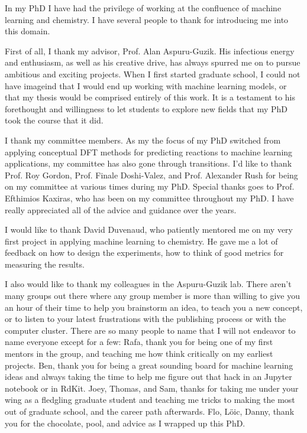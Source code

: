In my PhD I have had the privilege of working at the confluence of machine learning and chemistry. I have several people to thank for introducing me into this domain.

First of all, I thank my advisor, Prof. Alan Aspuru-Guzik. His infectious energy and enthusiasm, as well as his creative drive, has always spurred me on to pursue ambitious and exciting projects. When I first started graduate school, I could not have imageind that I would end up working with machine learning models, or that my thesis would be comprised entirely of this work. It is a testament to his forethought and willingness to let students to explore new fields that my PhD took the course that it did. 

I thank my committee members. As my the focus of my PhD switched from applying conceptual DFT methods for predicting reactions to machine learning applications, my committee has also gone through transitions. I'd like to thank Prof. Roy Gordon, Prof. Finale Doshi-Valez, and Prof. Alexander Rush for being on my committee at various times during my PhD. Special thanks goes to Prof. Efthimios Kaxiras, who has been on my committee throughout my PhD. I have really appreciated all of the advice and guidance over the years.

I would like to thank David Duvenaud, who patiently mentored me on my very first project in applying machine learning to chemistry. He gave me a lot of feedback on how to design the experiments, how to think of good metrics for measuring the results. 

I also would like to thank my colleagues in the Aspuru-Guzik lab.  There aren't many groups out there where any group member is more than willing to give you an hour of their time to help you brainstorm an idea, to teach you a new concept, or to listen to your latest frustrations with the publishing process or with the computer cluster. There are so many people to name that I will not endeavor to name everyone except for a few: Rafa, thank you for being one of my first mentors in the group, and teaching me how think critically on my earliest projects. Ben, thank you for being a great sounding board for machine learning ideas and always taking the time to help me figure out that hack in an Jupyter notebook or in RdKit. Joey, Thomas, and Sam, thanks for taking me under your wing as a fledgling graduate student and teaching me tricks to making the most out of graduate school, and the career path afterwards. Flo, L{\"o}ic, Danny, thank you for the chocolate, pool, and advice as I wrapped up this PhD. 

